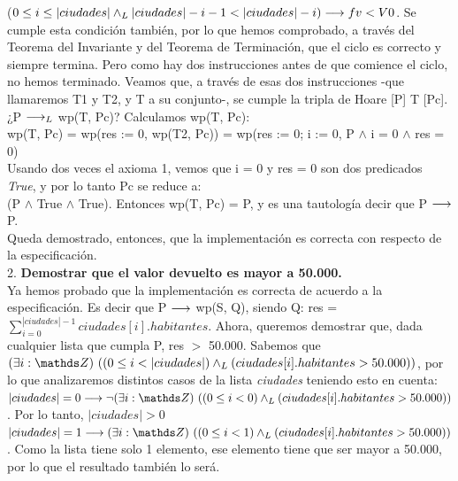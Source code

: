 \documentclass[10pt,a4paper]{article}
\begin{document}
    ($0\leq i \leq |ciudades| \land _L |ciudades| - i - 1 < |ciudades| - i) \longrightarrow fv < V0$. Se cumple esta condición también, por lo que hemos comprobado, a través del Teorema del Invariante y del Teorema de Terminación, que el ciclo es correcto y siempre termina. Pero como hay dos instrucciones antes de que comience el ciclo, no hemos terminado. Veamos que, a través de esas dos instrucciones -que llamaremos T1 y T2, y T a su conjunto-, se cumple la tripla de Hoare [P] T [Pc]. \\

    ¿P $\longrightarrow _L$ wp(T, Pc)? Calculamos wp(T, Pc):\\

    wp(T, Pc) = wp(res := 0, wp(T2, Pc)) = wp(res := 0; i := 0, P $\wedge$ i = 0 $\wedge$ res = 0)\\ 
    Usando dos veces el axioma 1, vemos que i = 0 y res = 0 son dos predicados \textit{True}, y por lo tanto Pc se reduce a:\\ (P $\wedge$ True $\wedge$ True). Entonces wp(T, Pc) = P, y es una tautología decir que P $\longrightarrow$ P.\\

    Queda demostrado, entonces, que la implementación es correcta con respecto de la especificación.\\
    

2. \textbf{Demostrar que el valor devuelto es mayor a 50.000.}\\

Ya hemos probado que la implementación es correcta de acuerdo a la especificación. Es decir que P $\longrightarrow$ wp(S, Q), siendo Q: res = $\sum\limits_{i=0}^{|ciudades| - 1}ciudades[i].habitantes$. Ahora, queremos demostrar que, dada cualquier lista que cumpla P, res $>$ 50.000.
Sabemos que $\existe[unalinea]{i}{\ent}{(0 \leq i < |ciudades|) \yLuego (ciudades[i].habitantes > 50.000)}$, por lo que analizaremos distintos casos de la lista \textit{ciudades} teniendo esto en cuenta:\\

$|ciudades| = 0 \implica \neg \existe[unalinea]{i}{\ent}{(0 \leq i < 0) \yLuego (ciudades[i].habitantes > 50.000)}$. Por lo tanto, $|ciudades| > 0$\\

$|ciudades| = 1 \implica \existe[unalinea]{i}{\ent}{(0 \leq i < 1) \yLuego (ciudades[i].habitantes > 50.000)}$. Como la lista tiene solo 1 elemento, ese elemento tiene que ser mayor a 50.000, por lo que el resultado también lo será.\\
\end{document}
